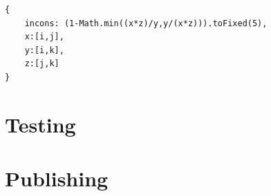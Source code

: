 \documentclass[11pt]{article} %
\begin{document}
\noindent
\begin{minipage}[c]{\linewidth}
\begin{lstlisting}[basicstyle=\scriptsize, tabsize=4, frame=single, caption=inconsistency JSON structure, label=code:inconsistency structure]
{
	incons: (1-Math.min((x*z)/y,y/(x*z))).toFixed(5),
	x:[i,j],
	y:[i,k],
	z:[j,k]
}
\end{lstlisting}
\end{minipage}






\section{Testing}

\section{Publishing}

\newpage
\printbibliography
\end{document}

